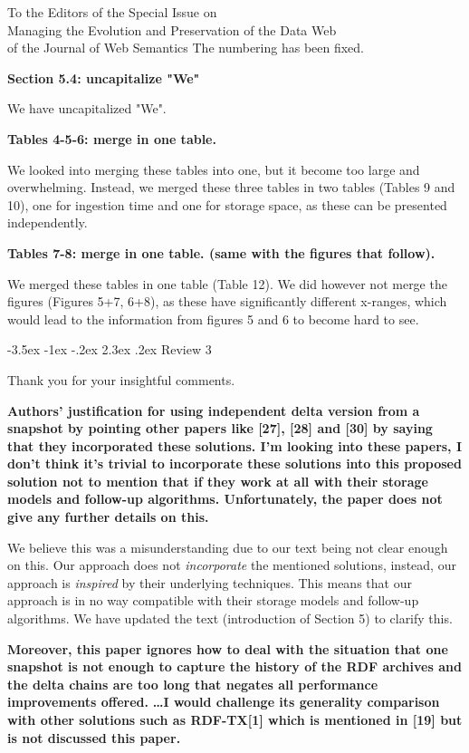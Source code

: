 \documentclass{letter}
\makeatletter
\newcounter{section}
\newcommand\section{\@startsection {section}{1}{\z@}%
                                   {-3.5ex \@plus -1ex \@minus -.2ex}%
                                   {2.3ex \@plus.2ex}%
                                   {\normalfont\Large\bfseries}}
\makeatother
\begin{document}
\begin{letter}{To the Editors of the Special Issue on\\Managing the Evolution and Preservation of the Data Web\\of the Journal of Web Semantics}
The numbering has been fixed.

\textbf{Section 5.4: uncapitalize "We" }

We have uncapitalized "We".

\textbf{Tables 4-5-6: merge in one table. }

We looked into merging these tables into one,
but it become too large and overwhelming.
Instead, we merged these three tables in two tables (Tables 9 and 10),
one for ingestion time and one for storage space, as these can be presented independently.

\textbf{Tables 7-8: merge in one table. (same with the figures that follow). }

We merged these tables in one table (Table 12).
We did however not merge the figures (Figures 5+7, 6+8), as these have significantly different x-ranges,
which would lead to the information from figures 5 and 6 to become hard to see.

\pagebreak
\section{Review 3}

Thank you for your insightful comments.

\textbf{Authors' justification for using independent delta version from a snapshot by pointing other papers like [27], [28] and [30] by saying that they incorporated these solutions. I'm looking into these papers, I don't think it's trivial to incorporate these solutions into this proposed solution not to mention that if they work at all with their storage models and follow-up algorithms. Unfortunately, the paper does not give any further details on this.}

We believe this was a misunderstanding due to our text being not clear enough on this.
Our approach does not \emph{incorporate} the mentioned solutions,
instead, our approach is \emph{inspired} by their underlying techniques.
This means that our approach is in no way compatible with their storage models and follow-up algorithms.
We have updated the text (introduction of Section 5) to clarify this.

\textbf{Moreover, this paper ignores how to deal with the situation that one snapshot is not enough to capture the history of the RDF archives and the delta chains are too long that negates all performance improvements offered.}
\textbf{\ldots I would challenge its generality comparison with other solutions such as RDF-TX[1] which is mentioned in [19] but is not discussed this paper.}


\end{letter}
\end{document}
